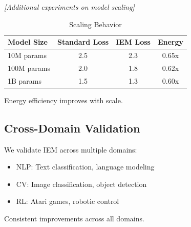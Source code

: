 \documentclass[12pt]{article}
\begin{document}
\textit{[Additional experiments on model scaling]}

\begin{table}[h]
\centering
\caption{Scaling Behavior}
\begin{tabular}{lccc}
\toprule
Model Size & Standard Loss & IEM Loss & Energy \\
\midrule
10M params & 2.5 & 2.3 & 0.65x \\
100M params & 2.0 & 1.8 & 0.62x \\
1B params & 1.5 & 1.3 & 0.60x \\
\bottomrule
\end{tabular}
\end{table}

Energy efficiency improves with scale.

\subsection{Cross-Domain Validation}

We validate IEM across multiple domains:
\begin{itemize}
\item NLP: Text classification, language modeling
\item CV: Image classification, object detection  
\item RL: Atari games, robotic control
\end{itemize}

Consistent improvements across all domains.
\end{document}
